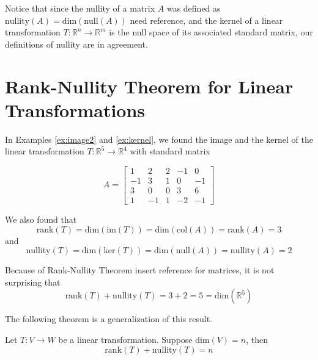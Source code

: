 \documentclass{ximera}
\newcommand{\RR}{\mathbb{R}}
\begin{document}
Notice that since the nullity of a matrix $A$ was defined as $\text{nullity}(A) = \text{dim}(\text{null}(A))$ {\color{red} need reference}, and the kernel of a linear transformation $T:\RR^n\rightarrow \RR^m$ is the null space of its associated standard matrix, our definitions of nullity are in agreement.

\section*{Rank-Nullity Theorem for Linear Transformations}

In Examples \ref{ex:image2} and \ref{ex:kernel}, we found the image and the kernel of the linear transformation $T:\RR^5\rightarrow \RR^4$ with standard matrix

$$A=\begin{bmatrix}1 & 2 & 2 &-1 & 0\\-1 & 3 & 1 & 0 & -1\\3 & 0 & 0 & 3 & 6\\ 1 & -1 & 1 & -2 & -1\end{bmatrix}$$

We also found that
$$\text{rank}(T)=\text{dim}(\text{im}(T))=\text{dim}(\text{col}(A))=\text{rank}(A)=3$$
and
$$\text{nullity}(T)=\text{dim}(\text{ker}(T))=\text{dim}(\text{null}(A))=\text{nullity}(A)=2$$

Because of Rank-Nullity Theorem {\color{red} insert reference} for matrices, it is not surprising that 
$$\text{rank}(T)+\text{nullity}(T)=3+2=5=\text{dim}(\RR^5)$$


The following theorem is a generalization of this result.

\begin{theorem}
Let $T:V\rightarrow W$ be a linear transformation.  Suppose $\text{dim}(V)=n$, then
$$\text{rank}(T)+\text{nullity}(T)=n$$
\end{theorem}
\end{document}
